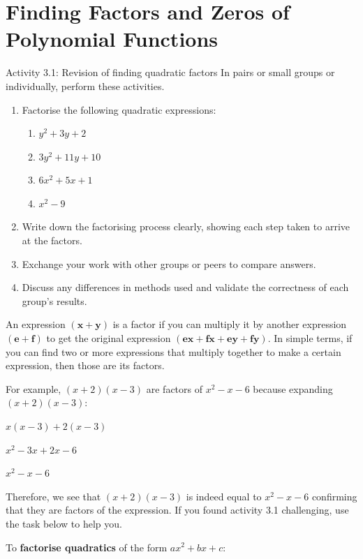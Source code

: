 \section{Finding Factors and Zeros of Polynomial Functions}

\begin{activity}{Activity 3.1: Revision of finding quadratic factors}
In pairs or small groups or individually, perform these activities.
\begin{enumerate}
  \item Factorise the following quadratic expressions:
  \begin{enumerate}
    \item[a.] $y^2 + 3y + 2$
    \item[b.] $3y^2 + 11y + 10$
    \item[c.] $6x^2 + 5x + 1$
    \item[d.] $x^2 - 9$
  \end{enumerate}
  \item Write down the factorising process clearly, showing each step taken to
  arrive at the factors.
  \item Exchange your work with other groups or peers to compare answers.
  \item Discuss any differences in methods used and validate the correctness of
  each group's results.
\end{enumerate}
\end{activity}

An expression $(\boldsymbol{x + y})$ is a factor if you can multiply it by another
expression $\boldsymbol{(e + f)}$ to get the original expression
$(\boldsymbol{ex + fx + ey + fy})$. In simple terms, if you can find two or more
expressions that multiply together to make a certain expression, then those are
its factors.

For example, $(x + 2)(x - 3)$ are factors of $x^2 - x - 6$ because expanding
$(x + 2)(x - 3)$:

$x(x - 3) + 2(x - 3)$

$x^2 - 3x + 2x - 6$

$x^2 - x - 6$

Therefore, we see that $(x + 2)(x - 3)$ is indeed equal to $x^2 - x - 6$ confirming
that they are factors of the expression. If you found activity 3.1 challenging, use
the task below to help you.

To \textbf{factorise quadratics} of the form $ax^2 + bx + c$:

